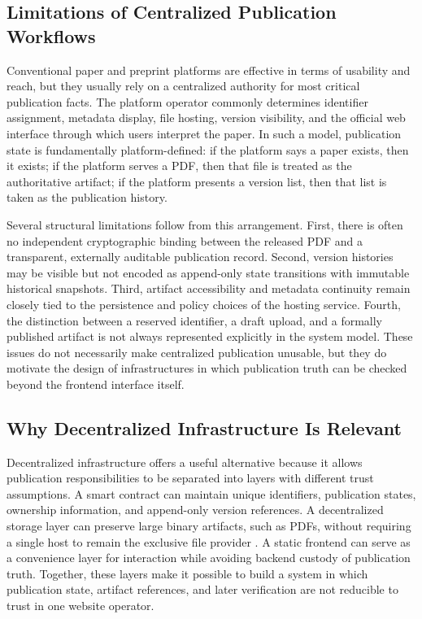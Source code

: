 \documentclass[journal]{IEEEtran}
\begin{document}
\subsection{Limitations of Centralized Publication Workflows}

Conventional paper and preprint platforms are effective in terms of usability and reach, but they usually rely on a centralized authority for most critical publication facts. The platform operator commonly determines identifier assignment, metadata display, file hosting, version visibility, and the official web interface through which users interpret the paper. In such a model, publication state is fundamentally platform-defined: if the platform says a paper exists, then it exists; if the platform serves a PDF, then that file is treated as the authoritative artifact; if the platform presents a version list, then that list is taken as the publication history.

Several structural limitations follow from this arrangement. First, there is often no independent cryptographic binding between the released PDF and a transparent, externally auditable publication record. Second, version histories may be visible but not encoded as append-only state transitions with immutable historical snapshots. Third, artifact accessibility and metadata continuity remain closely tied to the persistence and policy choices of the hosting service. Fourth, the distinction between a reserved identifier, a draft upload, and a formally published artifact is not always represented explicitly in the system model. These issues do not necessarily make centralized publication unusable, but they do motivate the design of infrastructures in which publication truth can be checked beyond the frontend interface itself.

\subsection{Why Decentralized Infrastructure Is Relevant}

Decentralized infrastructure offers a useful alternative because it allows publication responsibilities to be separated into layers with different trust assumptions. A smart contract can maintain unique identifiers, publication states, ownership information, and append-only version references. A decentralized storage layer can preserve large binary artifacts, such as PDFs, without requiring a single host to remain the exclusive file provider \cite{xu2019blockchain}. A static frontend can serve as a convenience layer for interaction while avoiding backend custody of publication truth. Together, these layers make it possible to build a system in which publication state, artifact references, and later verification are not reducible to trust in one website operator.
\end{document}
